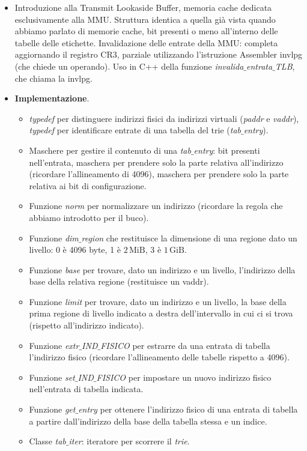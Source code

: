 \begin{itemize}
\begin{itemize}
		\item Introduzione alla Transmit Lookaside Buffer, memoria cache dedicata esclusivamente alla MMU. Struttura identica a quella già vista quando abbiamo parlato di memorie cache, bit presenti o meno all'interno delle tabelle delle etichette. Invalidazione delle entrate della MMU: completa aggiornando il registro CR3, parziale utilizzando l'istruzione Assembler invlpg (che chiede un operando). Uso in C++ della funzione \emph{invalida$\_$entrata$\_$TLB}, che chiama la invlpg.
		\item \textbf{Implementazione}.
		\begin{itemize}
			\item \emph{typedef} per distinguere indirizzi fisici da indirizzi virtuali (\emph{paddr} e \emph{vaddr}), \emph{typedef} per identificare entrate di una tabella del trie (\emph{tab$\_$entry}).
			\item Maschere per gestire il contenuto di una \emph{tab$\_$entry}: bit presenti nell'entrata, maschera per prendere solo la parte relativa all'indirizzo (ricordare l'allineamento di 4096), maschera per prendere solo la parte relativa ai bit di configurazione.
			\item Funzione \emph{norm} per normalizzare un indirizzo (ricordare la regola che abbiamo introdotto per il buco).
			\item Funzione \emph{dim$\_$region} che restituisce la dimensione di una regione dato un livello: $0$ è 4096 byte, 1 è $2\,\text{MiB}$, 3 è $1\,\text{GiB}$.
			\item Funzione \emph{base} per trovare, dato un indirizzo e un livello, l'indirizzo della base della relativa regione (restituisce un vaddr).
			\item Funzione \emph{limit} per trovare, dato un indirizzo e un livello, la base della prima regione di livello indicato a destra dell'intervallo in cui ci si trova (rispetto all'indirizzo indicato).
			\item Funzione \emph{extr$\_$IND$\_$FISICO} per estrarre da una entrata di tabella l'indirizzo fisico (ricordare l'allineamento delle tabelle rispetto a 4096). 
			\item Funzione \emph{set$\_$IND$\_$FISICO} per impostare un nuovo indirizzo fisico nell'entrata di tabella indicata.
			\item Funzione \emph{get$\_$entry} per ottenere l'indirizzo fisico di una entrata di tabella a partire dall'indirizzo della base della tabella stessa e un indice.
			\item Classe \emph{tab$\_$iter}: iteratore per scorrere il \emph{trie}. 

\end{itemize}
\end{itemize}
\end{itemize}
